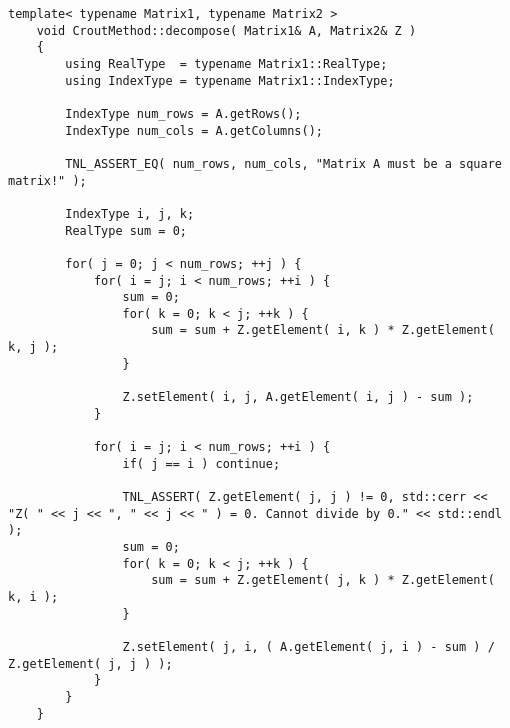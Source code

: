 \begin{lstlisting}[language={},caption={Implementation of the Crout method on the CPU using matrix $ \mathbb{Z} $. Taken from the Decomposition project repository on GitLab\protect\footref{Footnote:decomposition-project-gitlab-url}.},label={Listing:crout-method-implementation-CPU-Z}]
	template< typename Matrix1, typename Matrix2 >
	void CroutMethod::decompose( Matrix1& A, Matrix2& Z )
	{
		using RealType  = typename Matrix1::RealType;
		using IndexType = typename Matrix1::IndexType;
		
		IndexType num_rows = A.getRows();
		IndexType num_cols = A.getColumns();
		
		TNL_ASSERT_EQ( num_rows, num_cols, "Matrix A must be a square matrix!" );
		
		IndexType i, j, k;
		RealType sum = 0;
		
		for( j = 0; j < num_rows; ++j )	{
			for( i = j; i < num_rows; ++i ) {
				sum = 0;
				for( k = 0; k < j; ++k ) {
					sum = sum + Z.getElement( i, k ) * Z.getElement( k, j );
				}
				
				Z.setElement( i, j, A.getElement( i, j ) - sum );
			}
			
			for( i = j; i < num_rows; ++i ) {
				if( j == i ) continue;
				
				TNL_ASSERT( Z.getElement( j, j ) != 0, std::cerr << "Z( " << j << ", " << j << " ) = 0. Cannot divide by 0." << std::endl );
				sum = 0;
				for( k = 0; k < j; ++k ) {
					sum = sum + Z.getElement( j, k ) * Z.getElement( k, i );
				}
				
				Z.setElement( j, i, ( A.getElement( j, i ) - sum ) / Z.getElement( j, j ) );
			}
		}
	}
\end{lstlisting}




